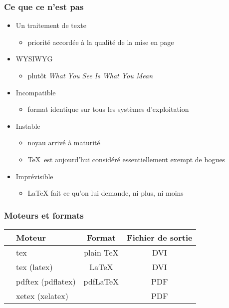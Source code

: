 \begin{frame}

	\frametitle{Ce que ce n'est pas}
	
	\begin{itemize}
		
		\item Un traitement de texte
		\begin{itemize}
			\item priorité accordée à la qualité de la mise en page
		\end{itemize}
	
		\item WYSIWYG
		\begin{itemize}
			\item plutôt \emph{What You See Is What You Mean}
		\end{itemize}
	
		\item Incompatible
		\begin{itemize}
			\item format identique sur tous les systèmes d’exploitation
		\end{itemize}
	
		\item Instable
		\begin{itemize}
			\item noyau arrivé à maturité
			\item \TeX\ est aujourd’hui considéré essentiellement exempt de bogues
		\end{itemize}
	
		\item Imprévisible
		\begin{itemize}
			\item {\LaTeX} fait ce qu’on lui demande, ni plus, ni moins
		\end{itemize}
	\end{itemize}
\end{frame}


\begin{frame}[c]

\frametitle{Moteurs et formats}

\begin{table}
	\begin{tabular}{rlcc}
		\hline\hline
						&	Moteur				&	Format			&	Fichier de sortie \\
		\hline
						&	tex					&	plain \TeX		&	DVI	\\
						&	tex (latex)			&	\LaTeX			&	DVI \\
		\faArrowRight	&	pdftex (pdflatex)	&	pdf\LaTeX		&	PDF \\
						&	xetex (xelatex)		&	\XeLaTeX		&	PDF \\
		\hline\hline
	\end{tabular}
\end{table}

\end{frame}

